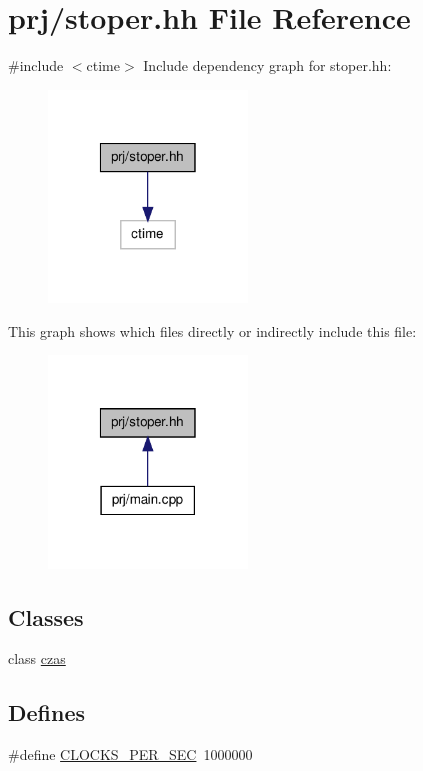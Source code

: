 \hypertarget{stoper_8hh}{\section{prj/stoper.hh \-File \-Reference}
\label{stoper_8hh}
}
{\ttfamily \#include $<$ctime$>$}\*
\-Include dependency graph for stoper.\-hh\-:\nopagebreak
\begin{figure}[H]
\begin{center}
\leavevmode
\includegraphics[width=150pt]{stoper_8hh__incl}
\end{center}
\end{figure}
\-This graph shows which files directly or indirectly include this file\-:\nopagebreak
\begin{figure}[H]
\begin{center}
\leavevmode
\includegraphics[width=150pt]{stoper_8hh__dep__incl}
\end{center}
\end{figure}
\subsection*{\-Classes}
\begin{DoxyCompactItemize}
\item 
class \hyperlink{classczas}{czas}
\end{DoxyCompactItemize}
\subsection*{\-Defines}
\begin{DoxyCompactItemize}
\item 
\#define \hyperlink{stoper_8hh_a3d9fc3c745d0880902fe3ea3d5d5f71e}{\-C\-L\-O\-C\-K\-S\-\_\-\-P\-E\-R\-\_\-\-S\-E\-C}~1000000
\end{DoxyCompactItemize}


